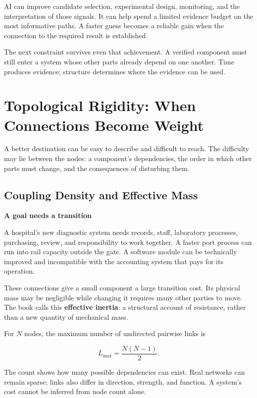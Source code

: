 \documentclass[11pt,openany]{book}
\newcommand{\term}[1]{\textbf{#1}}
\newcommand{\subhead}[1]{\par\medskip\noindent\textbf{#1}\par\nobreak\smallskip}
\begin{document}
AI can improve candidate selection, experimental design, monitoring, and the interpretation of those signals. It can help spend a limited evidence budget on the most informative paths. A faster guess becomes a reliable gain when the connection to the required result is established.

The next constraint survives even that achievement. A verified component must still enter a system whose other parts already depend on one another. Time produces evidence; structure determines where the evidence can be used.

\section{Topological Rigidity: When Connections Become Weight}

A better destination can be easy to describe and difficult to reach. The difficulty may lie between the nodes: a component's dependencies, the order in which other parts must change, and the consequences of disturbing them.

\subsection{Coupling Density and Effective Mass}

\subhead{A goal needs a transition}

A hospital's new diagnostic system needs records, staff, laboratory processes, purchasing, review, and responsibility to work together. A faster port process can run into rail capacity outside the gate. A software module can be technically improved and incompatible with the accounting system that pays for its operation.

These connections give a small component a large transition cost. Its physical mass may be negligible while changing it requires many other parties to move. The book calls this \term{effective inertia}: a structural account of resistance, rather than a new quantity of mechanical mass.

For $N$ nodes, the maximum number of undirected pairwise links is

\begin{equation}
L_{\max}=\frac{N(N-1)}2.
\end{equation}

The count shows how many possible dependencies can exist. Real networks can remain sparse; links also differ in direction, strength, and function. A system's cost cannot be inferred from node count alone.
\end{document}
